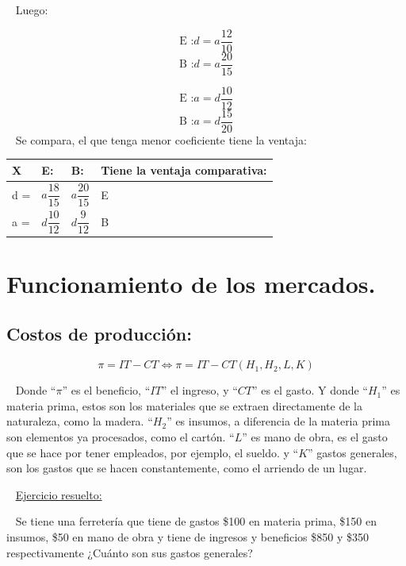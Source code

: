 \documentclass[
  letterpaper,
  DIV=11,
  numbers=noendperiod]{scrreport}
\begin{document}
~ Luego:

\[
\textrm{E :} d = a\frac{12}{10}
\] \[
\textrm{B :} d = a\frac{20}{15}
\]

\[
\textrm{E :} a = d\frac{10}{12}
\] \[
\textrm{B :} a = d\frac{15}{20}
\] ~ Se compara, el que tenga menor coeficiente tiene la ventaja:

\begin{table}[H]
    \centering
    \begin{tabular}{|p{10mm}|p{10mm}|p{10mm}|p{25mm}|}
        \hline
        X & E: & B: & Tiene la ventaja comparativa: \\ \hline
        d = \par & $a\dfrac{18}{15}$ & $a\dfrac{20}{15}$ & E \\ \hline
        a = \par & $d\dfrac{10}{12}$ & $d\dfrac{9}{12}$ & B \\ \hline
    \end{tabular}
\end{table}


\hypertarget{funcionamiento-de-los-mercados.}{%
\chapter{Funcionamiento de los
mercados.}\label{funcionamiento-de-los-mercados.}}

\hypertarget{costos-de-producciuxf3n}{%
\section{Costos de producción:}\label{costos-de-producciuxf3n}}

\[
\pi = IT-CT \Leftrightarrow \pi = IT-CT(H_1,H_2,L,K)
\]

~ Donde ``\(\pi\)'' es el beneficio, ``\(IT\)'' el ingreso, y ``\(CT\)''
es el gasto. Y donde ``\(H_1\)'' es materia prima, estos son los
materiales que se extraen directamente de la naturaleza, como la madera.
``\(H_2\)'' es insumos, a diferencia de la materia prima son elementos
ya procesados, como el cartón. ``\(L\)'' es mano de obra, es el gasto
que se hace por tener empleados, por ejemplo, el sueldo. y ``\(K\)''
gastos generales, son los gastos que se hacen constantemente, como el
arriendo de un lugar.

~ \ul{Ejercicio resuelto:}

~ Se tiene una ferretería que tiene de gastos \$100 en materia prima,
\$150 en insumos, \$50 en mano de obra y tiene de ingresos y beneficios
\$850 y \$350 respectivamente ¿Cuánto son sus gastos generales?
\end{document}

